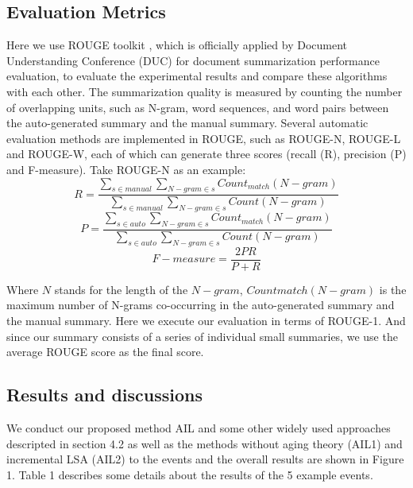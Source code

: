 \documentclass[runningheads,a4paper]{llncs}
\begin{document}
\subsection{Evaluation Metrics}
Here we use ROUGE toolkit \cite{2004-Lin-p74-81} , which is officially applied by Document Understanding Conference (DUC) for document summarization performance evaluation, to evaluate the experimental results and compare these algorithms with each other. The summarization quality is measured by counting the number of overlapping units, such as N-gram, word sequences, and word pairs between the auto-generated summary and the manual summary. Several automatic evaluation methods are implemented in ROUGE, such as ROUGE-N, ROUGE-L and ROUGE-W, each of which can generate three scores (recall (R), precision (P) and F-measure). Take ROUGE-N as an example:
\begin{equation}
R=\frac{\sum_{s \in manual } \sum_{N-gram \in s} Count_{match}(N-gram) } { \sum_{s \in manual} \sum_{N-gram \in s} Count(N-gram)  } \end{equation}
\begin{equation}
P=\frac{\sum_{s \in auto } \sum_{N-gram \in s} Count_{match}(N-gram) } { \sum_{s \in auto} \sum_{N-gram \in s} Count(N-gram)  }
\end{equation}
\begin{equation}
F-measure = \frac{2PR}{P+R}
\end{equation}

Where $N$ stands for the length of the $N-gram$, $Countmatch(N-gram)$ is the maximum number of N-grams co-occurring in the auto-generated summary and the manual summary. Here we execute our evaluation in terms of ROUGE-1. And since our summary consists of a series of individual small summaries, we use the average ROUGE score as the final score.

\subsection{Results and discussions}
We conduct our proposed method AIL and some other widely used approaches descripted in section 4.2 as well as the methods without aging theory (AIL1) and incremental LSA (AIL2) to the events and the overall results are shown in Figure 1. Table 1 describes some details about the results of the 5 example events.
\end{document}

